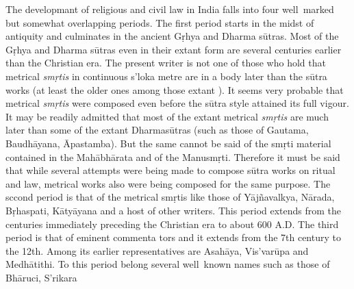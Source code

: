 \documentclass[11pt, openany]{book}
\begin{document}
The developmant of religious and civil law in India falls into four well\textendash\ marked but somewhat overlapping periods. The first period starts in the midst of antiquity and culminates in the ancient Gṛhya and Dharma sūtras. Most of the Gṛhya and Dharma sūtras even in their extant form are several centuries earlier than the Christian era. The present writer is not one of those who hold that metrical \emph{\en smṛtis} in continuous s'loka metre are in a body later than the sūtra works (at least the older ones among those extant ). It seems very probable that metrical \emph{\en smṛtis} were composed even before the sūtra style attained its full vigour. It may be readily admitted that most of the extant metrical \emph{\en smṛtis} are much later than some of the extant Dharmasūtras (such as those of Gautama, Baudhāyana, Āpastamba). But the same cannot be said of the smṛti material contained in the Mahābhārata and of the Manusmṛti. Therefore it must be said that while several attempts were being made to compose sūtra works on ritual and law, metrical works also were being composed for the same purpose. The sccond period is that of the metrical smṛtis like those of Yājñavalkya, Nārada, Bṛhaspati, Kātyāyana and a host of other writers. This period extends from the centuries immediately preceding the Christian era to about 600 A.D. The third period is that of eminent commenta tors and it extends from the 7th century to the 12th. Among its earlier representatives are Asahāya, Vis'varūpa and Medhātithi. To this period belong several well\textendash\ known names such as those of Bhāruci, S'rikara

\newpage
\end{document}
